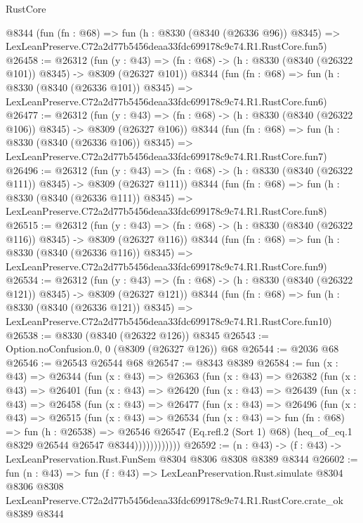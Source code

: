 \begin{lexlean}{RustCore}
\begin{coremodule}
    @8344
    (fun (fn : @68) =>
    fun (h : @8330 (@8340 (@26336 @96)) @8345) =>
    LexLeanPreserve.C72a2d77b5456deaa33fdc699178c9c74.R1.RustCore.fun5)
@26458 := @26312
    (fun (y : @43) => (fn : @68) -> (h : @8330 (@8340 (@26322 @101)) @8345) -> @8309 (@26327 @101))
    @8344
    (fun (fn : @68) =>
    fun (h : @8330 (@8340 (@26336 @101)) @8345) =>
    LexLeanPreserve.C72a2d77b5456deaa33fdc699178c9c74.R1.RustCore.fun6)
@26477 := @26312
    (fun (y : @43) => (fn : @68) -> (h : @8330 (@8340 (@26322 @106)) @8345) -> @8309 (@26327 @106))
    @8344
    (fun (fn : @68) =>
    fun (h : @8330 (@8340 (@26336 @106)) @8345) =>
    LexLeanPreserve.C72a2d77b5456deaa33fdc699178c9c74.R1.RustCore.fun7)
@26496 := @26312
    (fun (y : @43) => (fn : @68) -> (h : @8330 (@8340 (@26322 @111)) @8345) -> @8309 (@26327 @111))
    @8344
    (fun (fn : @68) =>
    fun (h : @8330 (@8340 (@26336 @111)) @8345) =>
    LexLeanPreserve.C72a2d77b5456deaa33fdc699178c9c74.R1.RustCore.fun8)
@26515 := @26312
    (fun (y : @43) => (fn : @68) -> (h : @8330 (@8340 (@26322 @116)) @8345) -> @8309 (@26327 @116))
    @8344
    (fun (fn : @68) =>
    fun (h : @8330 (@8340 (@26336 @116)) @8345) =>
    LexLeanPreserve.C72a2d77b5456deaa33fdc699178c9c74.R1.RustCore.fun9)
@26534 := @26312
    (fun (y : @43) => (fn : @68) -> (h : @8330 (@8340 (@26322 @121)) @8345) -> @8309 (@26327 @121))
    @8344
    (fun (fn : @68) =>
    fun (h : @8330 (@8340 (@26336 @121)) @8345) =>
    LexLeanPreserve.C72a2d77b5456deaa33fdc699178c9c74.R1.RustCore.fun10)
@26538 := @8330 (@8340 (@26322 @126)) @8345
@26543 := Option.noConfusion.{0, 0} (@8309 (@26327 @126)) @68
@26544 := @2036 @68
@26546 := @26543 @26544 @68
@26547 := @8343 @8389
@26584 := fun (x : @43) =>
  @26344
    (fun (x : @43) =>
    @26363
      (fun (x : @43) =>
      @26382
        (fun (x : @43) =>
        @26401
          (fun (x : @43) =>
          @26420
            (fun (x : @43) =>
            @26439
              (fun (x : @43) =>
              @26458
                (fun (x : @43) =>
                @26477
                  (fun (x : @43) =>
                  @26496
                    (fun (x : @43) =>
                    @26515
                      (fun (x : @43) =>
                      @26534
                        (fun (x : @43) =>
                        fun (fn : @68) =>
                        fun (h : @26538) =>
                        @26546
                          @26547
                          (Eq.refl.{2} (Sort 1) @68)
                          (heq_of_eq.{1} @8329 @26544 @26547 @8344))))))))))))
@26592 := (n : @43) -> (f : @43) -> LexLeanPreservation.Rust.FunSem @8304 @8306 @8308 @8389 @8344
@26602 := fun (n : @43) =>
  fun (f : @43) =>
  LexLeanPreservation.Rust.simulate
    @8304
    @8306
    @8308
    LexLeanPreserve.C72a2d77b5456deaa33fdc699178c9c74.R1.RustCore.crate_ok
    @8389
    @8344
\end{coremodule}
\end{lexlean}
